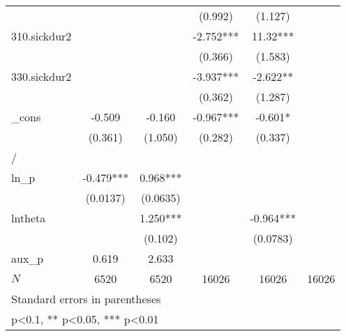 \begin{table}[htbp]
\begin{tabular}{l*{5}{c}}
            &               &               &     (0.992)   &     (1.127)   &               \\
[1em]
310.sickdur2&               &               &      -2.752***&       11.32***&               \\
            &               &               &     (0.366)   &     (1.583)   &               \\
[1em]
330.sickdur2&               &               &      -3.937***&      -2.622** &               \\
            &               &               &     (0.362)   &     (1.287)   &               \\
[1em]
\_cons      &      -0.509   &      -0.160   &      -0.967***&      -0.601*  &               \\
            &     (0.361)   &     (1.050)   &     (0.282)   &     (0.337)   &               \\
\hline
/           &               &               &               &               &               \\
ln\_p        &      -0.479***&       0.968***&               &               &               \\
            &    (0.0137)   &    (0.0635)   &               &               &               \\
[1em]
lntheta     &               &       1.250***&               &      -0.964***&               \\
            &               &     (0.102)   &               &    (0.0783)   &               \\
\hline
aux\_p       &       0.619   &       2.633   &               &               &               \\
\(N\)       &        6520   &        6520   &       16026   &       16026   &       16026   \\
\hline\hline
\multicolumn{6}{l}{\footnotesize Standard errors in parentheses}\\
\multicolumn{6}{l}{\footnotesize * p<0.1, ** p<0.05, *** p<0.01}\\
\end{tabular}
\end{table}
